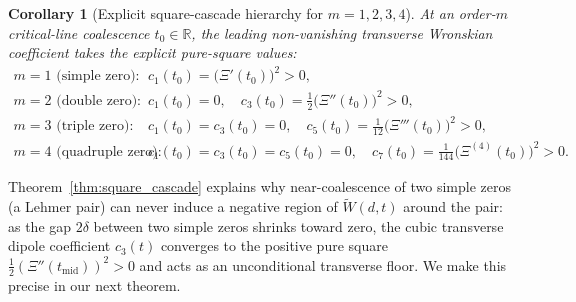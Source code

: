 \documentclass[11pt,reqno,a4paper]{amsart}
\theoremstyle{plain}
\newtheorem{corollary}[theorem]{Corollary}
\theoremstyle{definition}
\theoremstyle{remark}
\numberwithin{equation}{section}
\begin{document}
\begin{corollary}[Explicit square-cascade hierarchy for $m = 1,2,3,4$]\label{cor:cascade_hierarchy}
At an order-$m$ critical-line coalescence $t_0 \in \mathbb{R}$, the leading non-vanishing transverse Wronskian coefficient takes the explicit pure-square values:
\begin{equation}\label{eq:cascade_hierarchy_display}
\begin{aligned}
  m = 1 \text{ (simple zero):} &\quad c_1(t_0) = \big(\Xi'(t_0)\big)^2 > 0, \\
  m = 2 \text{ (double zero):} &\quad c_1(t_0) = 0, \quad c_3(t_0) = \frac{1}{2}\big(\Xi''(t_0)\big)^2 > 0, \\
  m = 3 \text{ (triple zero):} &\quad c_1(t_0) = c_3(t_0) = 0, \quad c_5(t_0) = \frac{1}{12}\big(\Xi'''(t_0)\big)^2 > 0, \\
  m = 4 \text{ (quadruple zero):} &\quad c_1(t_0) = c_3(t_0) = c_5(t_0) = 0, \quad c_7(t_0) = \frac{1}{144}\big(\Xi^{(4)}(t_0)\big)^2 > 0.
\end{aligned}
\end{equation}
\end{corollary}

Theorem~\ref{thm:square_cascade} explains why near-coalescence of two simple zeros (a Lehmer pair) can never induce a negative region of $\widetilde{W}(d,t)$ around the pair: as the gap $2\delta$ between two simple zeros shrinks toward zero, the cubic transverse dipole coefficient $c_3(t)$ converges to the positive pure square $\frac{1}{2}(\Xi''(t_{\mathrm{mid}}))^2 > 0$ and acts as an unconditional transverse floor. We make this precise in our next theorem.
\end{document}
